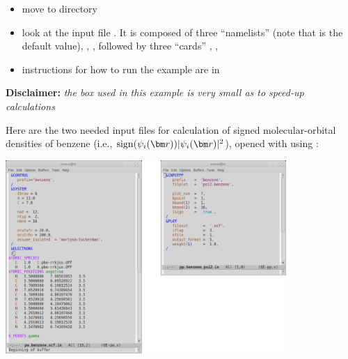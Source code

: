 \documentclass[landscape]{foils}
\begin{document}
\begin{itemize}
\item move to  directory
  \vspace{-0.5em}
\item look at the input file . It is composed of three
``namelists''  (note that 
is the default value), , , followed 
by three ``cards'' , ,
  \vspace{-0.5em}
\item instructions for how to run the example are in 
\end{itemize}
{\bf Disclaimer:} {\em the box used in this example is very small as to speed-up calculations}


Here are the two needed input files for calculation of signed
molecular-orbital densities of benzene (i.e.,
$\sign(\psi_i(\vr))|\psi_i(\vr)|^2$), opened with  using
:
\begin{center}
  \includegraphics[width=0.8\textwidth]{figs/inputs-benzene.png}
\end{center}

\end{document}
